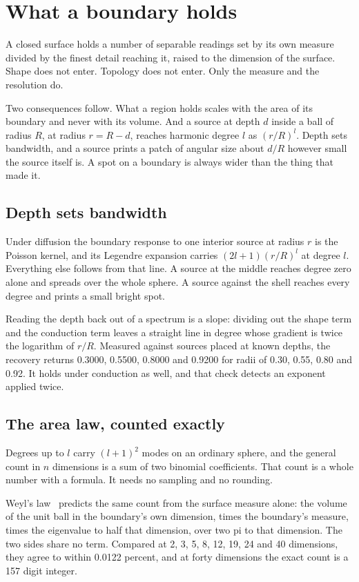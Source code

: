 \chapter{What a boundary holds}

A closed surface holds a number of separable readings set by its own measure divided by the finest detail reaching it, raised to the dimension of the surface. Shape does not enter. Topology does not enter. Only the measure and the resolution do.

Two consequences follow. What a region holds scales with the area of its boundary and never with its volume. And a source at depth $d$ inside a ball of radius $R$, at radius $r = R - d$, reaches harmonic degree $l$ as $(r/R)^l$. Depth sets bandwidth, and a source prints a patch of angular size about $d/R$ however small the source itself is. A spot on a boundary is always wider than the thing that made it.

\section{Depth sets bandwidth}

Under diffusion the boundary response to one interior source at radius $r$ is the Poisson kernel, and its Legendre expansion carries $(2l+1)(r/R)^l$ at degree $l$. Everything else follows from that line. A source at the middle reaches degree zero alone and spreads over the whole sphere. A source against the shell reaches every degree and prints a small bright spot.

Reading the depth back out of a spectrum is a slope: dividing out the shape term and the conduction term leaves a straight line in degree whose gradient is twice the logarithm of $r/R$. Measured against sources placed at known depths, the recovery returns 0.3000, 0.5500, 0.8000 and 0.9200 for radii of 0.30, 0.55, 0.80 and 0.92. It holds under conduction as well, and that check detects an exponent applied twice.

\section{The area law, counted exactly}

Degrees up to $l$ carry $(l+1)^2$ modes on an ordinary sphere, and the general count in $n$ dimensions is a sum of two binomial coefficients. That count is a whole number with a formula. It needs no sampling and no rounding.

Weyl's law~\cite{src:Weyl-1911} predicts the same count from the surface measure alone: the volume of the unit ball in the boundary's own dimension, times the boundary's measure, times the eigenvalue to half that dimension, over two pi to that dimension. The two sides share no term. Compared at 2, 3, 5, 8, 12, 19, 24 and 40 dimensions, they agree to within 0.0122 percent, and at forty dimensions the exact count is a 157 digit integer.

